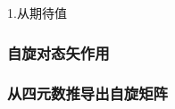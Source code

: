 
\begin{issues}
\issueDraft
1.从期待值
\end{issues}

\subsubsection{自旋对态矢作用}

\subsubsection{从四元数推导出自旋矩阵}
